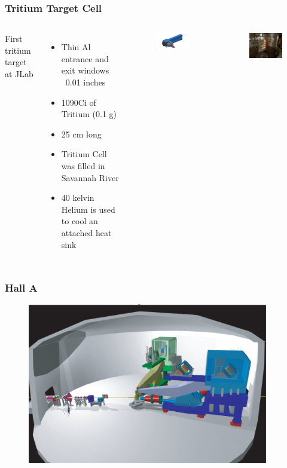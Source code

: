 \documentclass[12pt,usenames,dvipsnames]{beamer}
\begin{document}
\begin{frame}
\frametitle{Tritium Target Cell}
\begin{columns}[]
	First tritium target at JLab
	\begin{itemize}
		\item Thin Al entrance and exit windows ~0.01 inches
		\item 1090Ci of Tritium (0.1 g)
		\item 25 cm long
		\item Tritium Cell was filled in Savannah River
		\item 40 kelvin Helium is used to cool an attached heat sink
	\end{itemize}
	\begin{figure}
		\includegraphics[width=5cm]{../images/tgt_cell}
	\end{figure}
	\vspace{-10pt}
	\begin{figure}
		\includegraphics[width=5cm]{../images/tag_lat}
	\end{figure}
\end{columns}
\end{frame}


\begin{frame}
\frametitle{Hall A}
\begin{figure}
	\includegraphics[width=10.5cm]{../images/halla.pdf}
\end{figure}
\end{frame}
\end{document}
